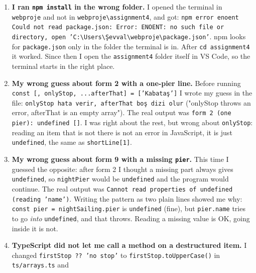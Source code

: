 \documentclass[
  10pt,
]{article}
\begin{document}
\begin{enumerate}
\def\labelenumi{\arabic{enumi}.}
\item
  \textbf{I ran \texttt{npm install} in the wrong folder.} I opened the
  terminal in \texttt{webproje} and not in
  \texttt{webproje\textbackslash{}assignment4}, and got:
  \texttt{npm error enoent Could not read package.\allowbreak{}json:\allowbreak{} Error:\allowbreak{} ENOENT:\allowbreak{} no such file or directory,\allowbreak{} open 'C:\allowbreak{}\textbackslash{}Users\textbackslash{}Şevval\textbackslash{}webproje\textbackslash{}package.\allowbreak{}json'}.
  npm looks for \texttt{package.\allowbreak{}json} only in the folder
  the terminal is in. After \texttt{cd assignment4} it worked. Since
  then I open the \texttt{assignment4} folder itself in VS Code, so the
  terminal starts in the right place.
\item
  \textbf{My wrong guess about form 2 with a one-pier line.} Before
  running
  \texttt{const [\allowbreak{},\allowbreak{} onlyStop,\allowbreak{} .\allowbreak{}.\allowbreak{}.\allowbreak{}afterThat] =\allowbreak{} [\allowbreak{}'Kabataş']}
  I wrote my guess in the file:
  \texttt{onlyStop hata verir,\allowbreak{} afterThat boş dizi olur}
  ("onlyStop throws an error, afterThat is an empty array"). The real
  output was
  \texttt{form 2 (\allowbreak{}one pier):\allowbreak{} undefined [\allowbreak{}]}.
  I was right about the rest, but wrong about \texttt{onlyStop}: reading
  an item that is not there is not an error in JavaScript, it is just
  \texttt{undefined}, the same as \texttt{shortLine[\allowbreak{}1]}.
\item
  \textbf{My wrong guess about form 9 with a missing \texttt{pier}.}
  This time I guessed the opposite: after form 2 I thought a missing
  part always gives \texttt{undefined}, so \texttt{nightPier} would be
  \texttt{undefined} and the program would continue. The real output was
  \texttt{Cannot read properties of undefined (\allowbreak{}reading 'name')}.
  Writing the pattern as two plain lines showed me why:
  \texttt{const pier =\allowbreak{} nightSailing.\allowbreak{}pier} is
  \texttt{undefined} (fine), but \texttt{pier.\allowbreak{}name} tries
  to go \emph{into} \texttt{undefined}, and that throws. Reading a
  missing value is OK, going inside it is not.
\item
  \textbf{TypeScript did not let me call a method on a destructured
  item.} I changed \texttt{firstStop ?? 'no stop'} to
  \texttt{firstStop.\allowbreak{}toUpperCase(\allowbreak{})} in
  \texttt{ts/\allowbreak{}arrays.\allowbreak{}ts} and

\end{enumerate}
\end{document}
